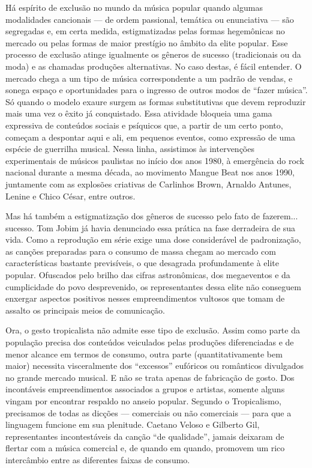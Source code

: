 Há espírito de exclusão no mundo da música popular quando algumas
modalidades cancionais --- de ordem passional, temática ou enunciativa
--- são segregadas e, em certa medida, estigmatizadas pelas formas
hegemônicas no mercado ou pelas formas de maior prestígio no âmbito da
elite popular. Esse processo de exclusão atinge igualmente os gêneros de
sucesso (tradicionais ou da moda) e as chamadas produções alternativas.
No caso destas, é fácil entender. O mercado chega a um tipo de música
correspondente a um padrão de vendas, e sonega espaço e oportunidades
para o ingresso de outros modos de ``fazer música''. Só quando o modelo
exaure surgem as formas substitutivas que devem reproduzir mais uma vez
o êxito já conquistado. Essa atividade bloqueia uma gama expressiva de
conteúdos sociais e psíquicos que, a partir de um certo ponto, começam a
despontar aqui e ali, em pequenos eventos, como expressão de uma espécie
de guerrilha musical. Nessa linha, assistimos às intervenções
experimentais de músicos paulistas no início dos anos 1980, à emergência
do rock nacional durante a mesma década, ao movimento Mangue Beat nos
anos 1990, juntamente com as explosões criativas de Carlinhos Brown,
Arnaldo Antunes, Lenine e Chico César, entre outros.

Mas há também a estigmatização dos gêneros de sucesso pelo fato de
fazerem... sucesso. Tom Jobim já havia denunciado essa prática na fase
derradeira de sua vida. Como a reprodução em série exige uma dose
considerável de padronização, as canções preparadas para o consumo de
massa chegam ao mercado com características bastante previsíveis, o que
desagrada profundamente à elite popular. Ofuscados pelo brilho das
cifras astronômicas, dos megaeventos e da cumplicidade do povo
desprevenido, os representantes dessa elite não conseguem enxergar
aspectos positivos nesses empreendimentos vultosos que tomam de assalto
os principais meios de comunicação.

Ora, o gesto tropicalista não admite esse tipo de exclusão. Assim como
parte da população precisa dos conteúdos veiculados pelas produções
diferenciadas e de menor alcance em termos de consumo, outra parte
(quantitativamente bem maior) necessita visceralmente dos ``excessos''
eufóricos ou românticos divulgados no grande mercado musical. E não se
trata apenas de fabricação de gosto. Dos incontáveis empreendimentos
associados a grupos e artistas, somente alguns vingam por encontrar
respaldo no anseio popular. Segundo o Tropicalismo, precisamos de todas
as dicções --- comerciais ou não comerciais --- para que a linguagem
funcione em sua plenitude. Caetano Veloso e Gilberto Gil, representantes
incontestáveis da canção ``de qualidade'', jamais deixaram de flertar
com a música comercial e, de quando em quando, promovem um rico
intercâmbio entre as diferentes faixas de consumo.

